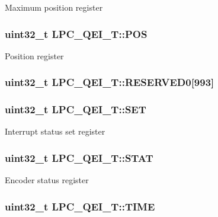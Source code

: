 Maximum position register \hypertarget{structLPC__QEI__T_a400314449370eff087c3c5e1e1c31cc1}{
\subsubsection[{P\-O\-S}]{ uint32\-\_\-t L\-P\-C\-\_\-\-Q\-E\-I\-\_\-\-T\-::\-P\-O\-S}}\label{structLPC__QEI__T_a400314449370eff087c3c5e1e1c31cc1}
Position register \hypertarget{structLPC__QEI__T_a4989c1bc50afbce2d2b4e966d2c518a5}{
\subsubsection[{R\-E\-S\-E\-R\-V\-E\-D0}]{ uint32\-\_\-t L\-P\-C\-\_\-\-Q\-E\-I\-\_\-\-T\-::\-R\-E\-S\-E\-R\-V\-E\-D0\mbox{[}993\mbox{]}}}\label{structLPC__QEI__T_a4989c1bc50afbce2d2b4e966d2c518a5}
\hypertarget{structLPC__QEI__T_a199af3383881188039525c15e18049a9}{
\subsubsection[{S\-E\-T}]{ uint32\-\_\-t L\-P\-C\-\_\-\-Q\-E\-I\-\_\-\-T\-::\-S\-E\-T}}\label{structLPC__QEI__T_a199af3383881188039525c15e18049a9}
Interrupt status set register \hypertarget{structLPC__QEI__T_a842c67512c5c8c9a31e7ba2ec4771784}{
\subsubsection[{S\-T\-A\-T}]{ uint32\-\_\-t L\-P\-C\-\_\-\-Q\-E\-I\-\_\-\-T\-::\-S\-T\-A\-T}}\label{structLPC__QEI__T_a842c67512c5c8c9a31e7ba2ec4771784}
Encoder status register \hypertarget{structLPC__QEI__T_a73a528b77fc560d229dc287237a9879e}{
\subsubsection[{T\-I\-M\-E}]{ uint32\-\_\-t L\-P\-C\-\_\-\-Q\-E\-I\-\_\-\-T\-::\-T\-I\-M\-E}}\label{structLPC__QEI__T_a73a528b77fc560d229dc287237a9879e}
